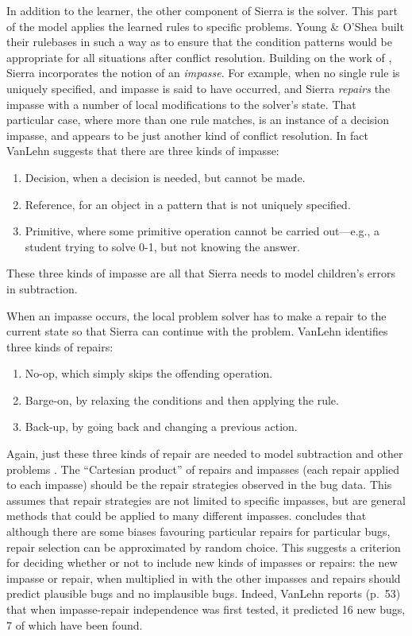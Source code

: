 In addition to the learner, the other component of Sierra is the solver.
This part of the model applies the learned rules to specific problems.
Young \& O'Shea built their rulebases in such a way as to ensure that
the condition patterns would be appropriate for all situations after
conflict resolution. Building on the work of , Sierra
incorporates the notion of an {\em impasse}.  For example, when no single
rule is uniquely specified, and impasse is said to have occurred, and
Sierra {\em repairs} the impasse with a number of local modifications to
the solver's state.  That particular case, where more than one rule
matches, is
an instance of a
decision impasse, and appears to be just another kind of conflict
resolution.  In fact VanLehn suggests that there are
three kinds of impasse:
\begin{enumerate}
\item Decision, when a decision is needed, but cannot be made.
\item Reference, for an object in a pattern that is not
uniquely specified.
\item Primitive, where some primitive operation cannot be carried
out---e.g., a student trying to solve 0-1, but not knowing the answer.
\end{enumerate}
These three kinds of impasse are all that Sierra needs to model children's
errors in subtraction.

When an impasse occurs, the local problem solver has to make a repair to
the current state so that Sierra can continue with the problem.  VanLehn
identifies three kinds of repairs:
\begin{enumerate}
\item No-op, which simply skips the offending operation.
\item Barge-on, by relaxing the conditions and then applying the rule.
\item Back-up, by going back and changing a previous action.
\end{enumerate}

Again, just these three kinds of repair are needed to model subtraction and
other problems \cite[p.~43]{mindbugs}. The ``Cartesian product'' of repairs
and impasses (each repair applied to each impasse) should be the repair
strategies observed in the bug data. This assumes that repair strategies
are not limited to specific impasses, but are general methods that could be
applied to many different impasses.  concludes
that although there are some biases favouring particular repairs for
particular bugs, repair selection can be approximated by random choice.
This suggests a criterion for deciding whether or not to
include new kinds of impasses or
repairs: the new impasse or repair, when multiplied in with the other
impasses and repairs should predict plausible bugs and no implausible bugs.
 Indeed, VanLehn reports (p.~53) that when impasse-repair independence was
first tested, it predicted 16 new bugs, 7 of which have been found.



